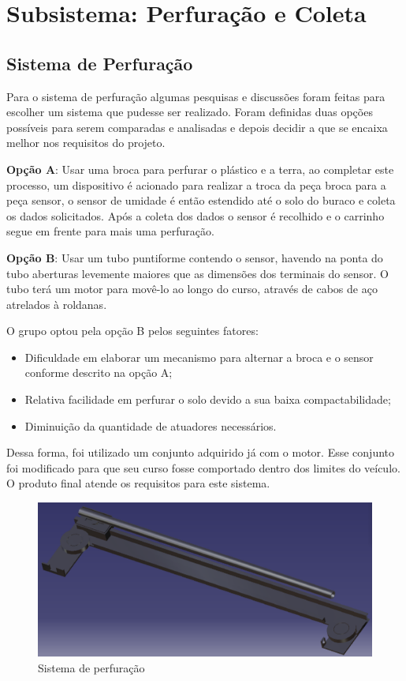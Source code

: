 \section{Subsistema: Perfuração e Coleta}

  \subsection{Sistema de Perfuração}
  
  Para o sistema de perfuração algumas pesquisas e discussões foram
  feitas para escolher um sistema que pudesse ser realizado. Foram
  definidas duas opções possíveis para serem comparadas e analisadas
  e depois decidir a que se encaixa melhor nos requisitos do projeto.

  \textbf{Opção A}: Usar uma broca para perfurar o plástico e a terra, ao completar este
  processo, um dispositivo é acionado para realizar a troca da peça broca para
  a peça sensor, o sensor de umidade é então estendido até o solo do buraco e
  coleta os dados solicitados. Após a coleta dos dados o sensor é recolhido e o
  carrinho segue em frente para mais uma perfuração.

  \textbf{Opção B}: Usar um tubo puntiforme contendo o sensor, havendo na ponta do
  tubo aberturas levemente maiores que as dimensões dos terminais do sensor. O tubo terá
  um motor para movê-lo ao longo do curso, através de cabos de aço atrelados à roldanas. 

  O grupo optou pela opção B pelos seguintes fatores:

 \begin{itemize}
	\item Dificuldade em elaborar um mecanismo para alternar a broca e o sensor
	conforme descrito na opção A;
	\item Relativa facilidade em perfurar o solo devido a sua baixa compactabilidade;
	\item Diminuição da quantidade de atuadores necessários.
 \end{itemize}

	Dessa forma, foi utilizado um conjunto adquirido já com o motor. Esse conjunto
	foi modificado para que seu curso fosse comportado dentro dos limites do veículo.
	O produto final atende os requisitos para este sistema.
	
		\begin{figure}[!htbp]
			\begin{center}
				\includegraphics[width=.4\textwidth]{figuras/perfuracao.eps}
				\caption{Sistema de perfuração}
			\end{center}
		\end{figure}
		
